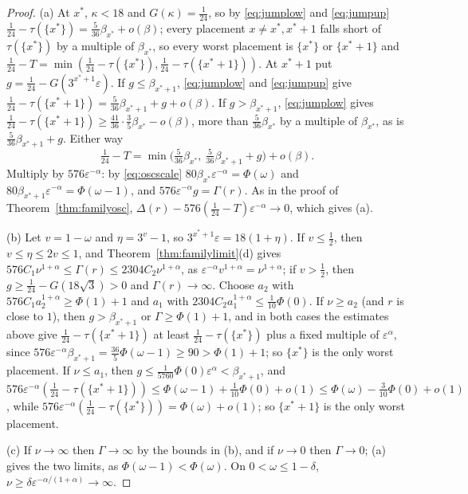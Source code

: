\documentclass[11pt]{article}
\begin{document}
\begin{proof}
(a) At $x^*$, $\kappa<18$ and $G(\kappa)=\tfrac1{24}$, so by
\eqref{eq:jumplow} and \eqref{eq:jumpup}
$\tfrac1{24}-\tau(\{x^*\})=\tfrac5{36}\beta_{x^*}+o(\beta)$; every placement
$x\ne x^*,x^*+1$ falls short of $\tau(\{x^*\})$ by a multiple of
$\beta_{x^*}$, so every worst placement is $\{x^*\}$ or $\{x^*+1\}$ and
$\tfrac1{24}-T=\min(\tfrac1{24}-\tau(\{x^*\}),\tfrac1{24}-\tau(\{x^*+1\}))$.
At $x^*+1$ put $g=\tfrac1{24}-G(3^{x^*+1}\varepsilon)$.  If
$g\le\beta_{x^*+1}$, \eqref{eq:jumplow} and \eqref{eq:jumpup} give
$\tfrac1{24}-\tau(\{x^*+1\})=\tfrac5{36}\beta_{x^*+1}+g+o(\beta)$.  If
$g>\beta_{x^*+1}$, \eqref{eq:jumplow} gives
$\tfrac1{24}-\tau(\{x^*+1\})\ge\tfrac{41}{36}\cdot\tfrac35\beta_{x^*}-o(\beta)$,
more than $\tfrac5{36}\beta_{x^*}$ by a multiple of $\beta_{x^*}$, as is
$\tfrac5{36}\beta_{x^*+1}+g$.  Either way
\[
  \tfrac1{24}-T=\min\bigl(\tfrac5{36}\beta_{x^*},\ \tfrac5{36}\beta_{x^*+1}+g\bigr)+o(\beta).
\]
Multiply by $576\varepsilon^{-\alpha}$: by \eqref{eq:oscscale}
$80\beta_{x^*}\varepsilon^{-\alpha}=\Phi(\omega)$ and
$80\beta_{x^*+1}\varepsilon^{-\alpha}=\Phi(\omega-1)$, and
$576\varepsilon^{-\alpha}g=\Gamma(r)$.  As in the proof of
Theorem~\ref{thm:familyosc}, $\Delta(r)-576(\tfrac1{24}-T)\varepsilon^{-\alpha}\to0$,
which gives (a).

(b) Let $v=1-\omega$ and $\eta=3^v-1$, so $3^{x^*+1}\varepsilon=18(1+\eta)$.
If $v\le\tfrac12$, then $v\le\eta\le2v\le1$, and
Theorem~\ref{thm:familylimit}(d) gives
$576C_1\nu^{1+\alpha}\le\Gamma(r)\le2304C_2\nu^{1+\alpha}$, as
$\varepsilon^{-\alpha}v^{1+\alpha}=\nu^{1+\alpha}$; if $v>\tfrac12$, then
$g\ge\tfrac1{24}-G(18\sqrt3)>0$ and $\Gamma(r)\to\infty$.  Choose $a_2$ with
$576C_1a_2^{1+\alpha}\ge\Phi(1)+1$ and $a_1$ with
$2304C_2a_1^{1+\alpha}\le\tfrac1{10}\Phi(0)$.  If $\nu\ge a_2$ (and $r$ is close
to $1$), then $g>\beta_{x^*+1}$ or $\Gamma\ge\Phi(1)+1$, and in both cases
the estimates above give $\tfrac1{24}-\tau(\{x^*+1\})$ at least
$\tfrac1{24}-\tau(\{x^*\})$ plus a fixed multiple of
$\varepsilon^\alpha$, since $576\varepsilon^{-\alpha}\beta_{x^*+1}=\tfrac{36}5\Phi(\omega-1)\ge90>\Phi(1)+1$;
so $\{x^*\}$ is the only worst placement.  If $\nu\le a_1$, then
$g\le\tfrac1{5760}\Phi(0)\varepsilon^\alpha<\beta_{x^*+1}$, and
$576\varepsilon^{-\alpha}(\tfrac1{24}-\tau(\{x^*+1\}))\le\Phi(\omega-1)+\tfrac1{10}\Phi(0)+o(1)
\le\Phi(\omega)-\tfrac3{10}\Phi(0)+o(1)$, while
$576\varepsilon^{-\alpha}(\tfrac1{24}-\tau(\{x^*\}))=\Phi(\omega)+o(1)$; so
$\{x^*+1\}$ is the only worst placement.

(c) If $\nu\to\infty$ then $\Gamma\to\infty$ by the bounds in (b), and if
$\nu\to0$ then $\Gamma\to0$; (a) gives the two limits, as
$\Phi(\omega-1)<\Phi(\omega)$.  On $0<\omega\le1-\delta$,
$\nu\ge\delta\varepsilon^{-\alpha/(1+\alpha)}\to\infty$.
\end{proof}
\end{document}
